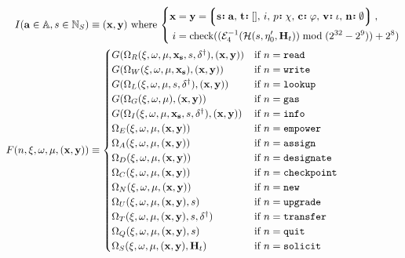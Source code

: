 \begin{align}
  I(\mathbf{a} \in \mathbb{A}, s \in \N_S) &\equiv (\mathbf{x}, \mathbf{y}) \text{ where }
  \left\{ \begin{aligned}
    \mathbf{x} &= \mathbf{y} = \tup{\is{\mathbf{s}}{\mathbf{a}}\ts\is{\mathbf{t}}{[]}\ts i\ts\is{p}{\chi}\ts\is{\mathbf{c}}{\varphi}\ts\is{\mathbf{v}}{\iota}\ts\is{\mathbf{n}}{\emptyset}}\ ,\\
    i &= \text{check}((\de_4(\mathcal{H}(s, \eta'_0, \mathbf{H}_t)) \bmod (2^{32}-2^9)) + 2^8)
  \end{aligned} \right. \\
  F(n, \xi, \omega, \mu, (\mathbf{x}, \mathbf{y})) &\equiv \begin{cases}
    G(\Omega_R(\xi, \omega, \mu, \mathbf{x}_\mathbf{s}, s, \delta^\dagger), (\mathbf{x}, \mathbf{y})) &\when n = \mathtt{read} \\
    G(\Omega_W(\xi, \omega, \mu, \mathbf{x}_\mathbf{s}), (\mathbf{x}, \mathbf{y})) &\when n = \mathtt{write} \\
    G(\Omega_L(\xi, \omega, \mu, s, \delta^\dagger), (\mathbf{x}, \mathbf{y})) &\when n = \mathtt{lookup} \\
    G(\Omega_G(\xi, \omega, \mu), (\mathbf{x}, \mathbf{y})) &\when n = \mathtt{gas} \\
    G(\Omega_I(\xi, \omega, \mu, \mathbf{x}_\mathbf{s}, s, \delta^\dagger), (\mathbf{x}, \mathbf{y})) &\when n = \mathtt{info} \\
    \Omega_E(\xi, \omega, \mu, (\mathbf{x}, \mathbf{y})) &\when n = \mathtt{empower}\\
    \Omega_A(\xi, \omega, \mu, (\mathbf{x}, \mathbf{y})) &\when n = \mathtt{assign}\\
    \Omega_D(\xi, \omega, \mu, (\mathbf{x}, \mathbf{y})) &\when n = \mathtt{designate}\\
    \Omega_C(\xi, \omega, \mu, (\mathbf{x}, \mathbf{y})) &\when n = \mathtt{checkpoint} \\
    \Omega_N(\xi, \omega, \mu, (\mathbf{x}, \mathbf{y})) &\when n = \mathtt{new} \\
    \Omega_U(\xi, \omega, \mu, (\mathbf{x}, \mathbf{y}), s) &\when n = \mathtt{upgrade} \\
    \Omega_T(\xi, \omega, \mu, (\mathbf{x}, \mathbf{y}), s, \delta^\dagger) &\when n = \mathtt{transfer} \\
    \Omega_Q(\xi, \omega, \mu, (\mathbf{x}, \mathbf{y}), s) &\when n = \mathtt{quit} \\
    \Omega_S(\xi, \omega, \mu, (\mathbf{x}, \mathbf{y}), \mathbf{H}_t) &\when n = \mathtt{solicit} \\

\end{cases}
\end{align}
